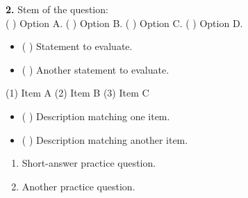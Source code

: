 \documentclass[11pt,a4paper]{article}
\newcommand{\ativtitulo}[1]{\vspace{6pt}{\bfseries #1}\par\vspace{2pt}}
\begin{document}
\textbf{2.} Stem of the question:\\[2pt]
\quad ( ) Option A. \quad ( ) Option B. \quad ( ) Option C. \quad ( ) Option D.\\[4pt]

\ativtitulo{3 -- [TRUE_FALSE_LABEL]}
\begin{itemize}[nosep,leftmargin=14pt]
\item ( ) Statement to evaluate.
\item ( ) Another statement to evaluate.
\end{itemize}

\ativtitulo{4 -- [MATCHING_LABEL]}
(1) Item A \quad (2) Item B \quad (3) Item C\\[4pt]
\begin{itemize}[nosep,leftmargin=14pt]
\item ( ) Description matching one item.
\item ( ) Description matching another item.
\end{itemize}

\ativtitulo{5 -- [PRACTICE_LABEL]}
\begin{enumerate}[nosep,leftmargin=14pt]
\item Short-answer practice question.
\item Another practice question.
\end{enumerate}
\end{document}
